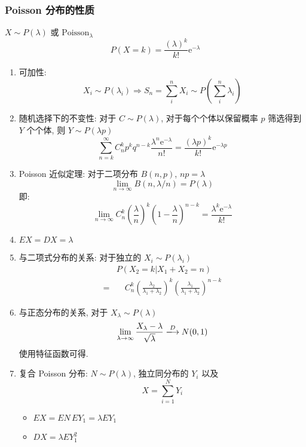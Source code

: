 \documentclass[11pt,a4paper,twocolumn]{article} %
\numberwithin{equation}{section} %
\newcommand\e{\mathrm{e}} %
\begin{document}
\subsubsection{Poisson 分布的性质} %
\label{ssub:poisson_dist}
$X\sim P(\lambda)$ 或 $\mbox{Poisson}_{\lambda}$
\begin{equation}
	P(X = k) = \frac{(\lambda )^k}{k!}\e^{-\lambda }
\end{equation}
\begin{enumerate}
	\item 可加性: 
	\begin{equation}
		X_i\sim P(\lambda_i) \Rightarrow 
		S_n = \sum_i^n X_i \sim P\left(\sum_i^n \lambda_i\right)
	\end{equation}
	\item 随机选择下的不变性: 对于 $C\sim P(\lambda)$, 对于每个个体以保留概率 
	$p$ 筛选得到 $Y$ 个个体, 则 $Y\sim P(\lambda p)$
	\begin{equation}
		\sum_{n=k}^\infty C_n^k p^kq^{n-k} \frac{\lambda^n \e^{-\lambda}}{n!}
		= \frac{(\lambda p)^k}{k!}\e^{-\lambda p}
	\end{equation}
	\item Poisson 近似定理: 对于二项分布 $B(n,p)$, $np = \lambda$
	\begin{equation}\label{equ:poisson_approx}
		\lim_{n\to \infty} B(n, \lambda/n) = P(\lambda)
	\end{equation}
	即: 
	\begin{equation}
		\lim_{n\to\infty} C_n^k\left(\frac{\lambda}{n}\right)^k
		\left(1-\frac{\lambda}{n}\right)^{n-k} 
		= \frac{\lambda^k \e^{-\lambda}}{k!}
	\end{equation}
	\item $EX = DX = \lambda$
	\item 与二项式分布的关系: 对于独立的 $X_i\sim P(\lambda_i)$
	\begin{equation}\label{equ:p_to_b}
	\begin{split}
		&P(X_2 = k|X_1 + X_2 = n) \\
		= &\quad C_n^k \left(\frac{\lambda_2}{\lambda_1 + \lambda_2}\right)^k 
		\left(\frac{\lambda_1}{\lambda_1+\lambda_2}\right)^{n-k}
	\end{split}
	\end{equation}
	\item 与正态分布的关系, 对于 $X_\lambda\sim P(\lambda)$
	\begin{equation}
		\lim_{\lambda\to\infty} \frac{X_\lambda - \lambda}{\sqrt{\lambda}}
		\xlongrightarrow{D} N(0,1)
	\end{equation}
	使用特征函数可得.
	\item 复合 Poisson 分布: $N\sim P(\lambda)$, 独立同分布的 $Y_i$ 以及
	$$
	X = \sum_{i=1}^N Y_i
	$$
	\begin{itemize}
		\item $EX = EN\,EY_1 = \lambda EY_1$
		\item $DX = \lambda EY_1^2$
	\end{itemize}
\end{enumerate}
\end{document}
